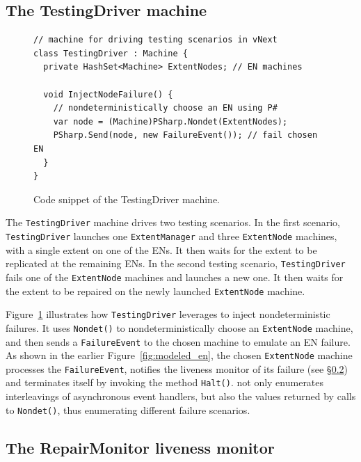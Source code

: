 \subsection{The TestingDriver machine}
\label{sec:method:driver}

\begin{figure}[t]
\begin{lstlisting}
// machine for driving testing scenarios in vNext
class TestingDriver : Machine {
  private HashSet<Machine> ExtentNodes; // EN machines

  void InjectNodeFailure() {
    // nondeterministically choose an EN using P#
    var node = (Machine)PSharp.Nondet(ExtentNodes);    
    PSharp.Send(node, new FailureEvent()); // fail chosen EN
  }
}
\end{lstlisting}
\vspace{-4mm}
\caption{Code snippet of the TestingDriver machine.}
\label{fig:testing_driver}
\vspace{-4mm}
\end{figure}

The \texttt{TestingDriver} machine drives two testing scenarios. In the first scenario, \texttt{TestingDriver} launches one \texttt{ExtentManager} and three \texttt{ExtentNode} machines, with a single extent on one of the ENs. It then waits for the extent to be replicated at the remaining ENs. In the second testing scenario, \texttt{TestingDriver} fails one of the \texttt{ExtentNode} machines and launches a new one. It then waits for the extent to be repaired on the newly launched \texttt{ExtentNode} machine.

Figure~\ref{fig:testing_driver} illustrates how \texttt{TestingDriver} leverages \psharp to inject nondeterministic failures. It uses \texttt{Nondet()} to nondeterministically choose an \texttt{ExtentNode} machine, and then sends a \texttt{FailureEvent} to the chosen machine to emulate an EN failure. As shown in the earlier Figure~\ref{fig:modeled_en}, the chosen \texttt{ExtentNode} machine processes the \texttt{FailureEvent}, notifies the liveness monitor of its failure (see \S\ref{sec:method:monitor}) and terminates itself by invoking the \psharp method \texttt{Halt()}. \psharp not only enumerates interleavings of asynchronous event handlers, but also the values returned by calls to \texttt{Nondet()}, thus enumerating different failure scenarios.

\subsection{The RepairMonitor liveness monitor}
\label{sec:method:monitor}


